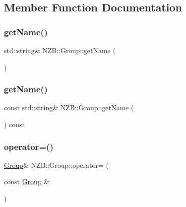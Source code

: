 \subsection{Member Function Documentation}
\hypertarget{class_n_z_b_1_1_group_a362fd5943887fb40d051d45f7f96bc2b}{}\label{class_n_z_b_1_1_group_a362fd5943887fb40d051d45f7f96bc2b} 
\subsubsection{\texorpdfstring{get\+Name()}{getName()}\hspace{0.1cm}{\footnotesize\ttfamily [1/2]}}
{\footnotesize\ttfamily std\+::string\& N\+Z\+B\+::\+Group\+::get\+Name (\begin{DoxyParamCaption}{ }\end{DoxyParamCaption})\hspace{0.3cm}{\ttfamily [inline]}}

\hypertarget{class_n_z_b_1_1_group_aad7e7bfaf13affed32b1bb01df19ef01}{}\label{class_n_z_b_1_1_group_aad7e7bfaf13affed32b1bb01df19ef01} 
\subsubsection{\texorpdfstring{get\+Name()}{getName()}\hspace{0.1cm}{\footnotesize\ttfamily [2/2]}}
{\footnotesize\ttfamily const std\+::string\& N\+Z\+B\+::\+Group\+::get\+Name (\begin{DoxyParamCaption}{ }\end{DoxyParamCaption}) const\hspace{0.3cm}{\ttfamily [inline]}}

\hypertarget{class_n_z_b_1_1_group_a38caf694b0702f968d220c1dd7105fb3}{}\label{class_n_z_b_1_1_group_a38caf694b0702f968d220c1dd7105fb3} 
\subsubsection{\texorpdfstring{operator=()}{operator=()}\hspace{0.1cm}{\footnotesize\ttfamily [1/2]}}
{\footnotesize\ttfamily \hyperlink{class_n_z_b_1_1_group}{Group}\& N\+Z\+B\+::\+Group\+::operator= (\begin{DoxyParamCaption}\item[{const \hyperlink{class_n_z_b_1_1_group}{Group} \&}]{ }\end{DoxyParamCaption})\hspace{0.3cm}{\ttfamily [default]}}

